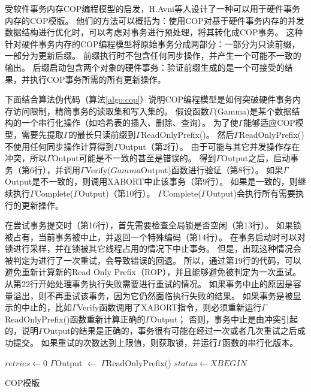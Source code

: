受软件事务内存COP编程模型的启发，H.Avni等人\cite{avni2014improving}设计了一种可以用于硬件事务内存的COP模版。
他们的方法可以概括为：使用COP对基于硬件事务内存的并发数据结构进行优化时，可以考虑对事务进行预处理，将其转化成COP事务。
这种针对硬件事务内存的COP编程模型将原始事务分成两部分：一部分为只读前缀，一部分为更新后缀。
前缀执行时不包含任何同步操作，并产生一个可能不一致的输出。
后缀启动包含两个对象的硬件事务：验证前缀生成的是一个可接受的结果，并执行COP事务所需的所有更新操作。

下面结合算法伪代码（算法\ref{algo:cop}）说明COP编程模型是如何突破硬件事务内存访问限制，精简事务的读取集和写入集的。
假设函数$\Gamma$(Gamma)是某个数据结构的一个串行化操作（如哈希表的插入、删除、查询）。
为了使$\Gamma$能够适应COP模型，需要先提取$\Gamma$的最长只读前缀到$\Gamma$ReadOnlyPrefix()。
然后$\Gamma$ReadOnlyPrefix()不使用任何同步操作计算得到$\Gamma$Output（第2行）。
由于可能与其它并发操作存在冲突，所以$\Gamma$Output可能是不一致的甚至是错误的。
得到$\Gamma$Output之后，启动事务（第6行），并调用$\Gamma$Verify($Gamma$Output)函数进行验证（第8行）。
如果$\Gamma$Output是不一致的，则调用XABORT中止该事务（第9行）。
如果是一致的，则继续执行$\Gamma$Complete($\Gamma$Output)（第10行）。
$\Gamma$Complete($\Gamma$Output)会执行所有需要执行的更新操作。

在尝试事务提交时（第16行），首先需要检查全局锁是否空闲（第13行）。
如果锁被占有，当前事务被中止，并返回一个特殊编码（第14行）。
在事务启动时可以对锁进行采样，并在锁被其它线程占用的情况下中止事务。
但是，出现这种情况会被判定为进行了一次重试，会导致错误的回退。
所以，通过第19行的代码，可以避免重新计算新的Read Only Prefix（ROP），并且能够避免被判定为一次重试。
从第22行开始处理事务执行失败需要进行重试的情况。
如果事务中止的原因是容量溢出，则不再重试该事务，因为它仍然面临执行失败的结果。
如果事务是被显示的中止的，比如$\Gamma$Verify函数调用了XABORT指令，则必须重新运行$\Gamma$ReadOnlyPrefix()函数重新计算正确的$\Gamma$Output；
否则，事务中止是由冲突引起的，说明$\Gamma$Output的结果是正确的，事务很有可能在经过一次或者几次重试之后成功提交。
如果重试的次数达到上限值，则获取锁，并运行$\Gamma$函数的串行化版本。

 \begin{algorithm}[htbp]
 \SetAlgoLined
$retries \gets 0$\;
 $\Gamma$Output $\gets$ $\Gamma$ReadOnlyPrefix()\;
$status \gets XBEGIN$\;
 \caption{COP模版}
 \label{algo:cop}
 \end{algorithm}

